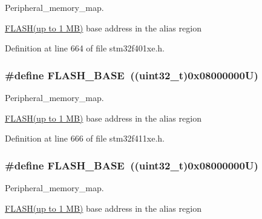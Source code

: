 Peripheral\+\_\+memory\+\_\+map. 

\hyperlink{group___peripheral__declaration_ga844ea28ba1e0a5a0e497f16b61ea306b}{F\+L\+A\+S\+H(up to 1 M\+B)} base address in the alias region 

Definition at line 664 of file stm32f401xe.\+h.

\subsubsection[{\texorpdfstring{F\+L\+A\+S\+H\+\_\+\+B\+A\+SE}{FLASH_BASE}}]{\setlength{\rightskip}{0pt plus 5cm}\#define F\+L\+A\+S\+H\+\_\+\+B\+A\+SE~((uint32\+\_\+t)0x08000000\+U)}\hypertarget{group___peripheral__registers__structures_ga23a9099a5f8fc9c6e253c0eecb2be8db}{}\label{group___peripheral__registers__structures_ga23a9099a5f8fc9c6e253c0eecb2be8db}


Peripheral\+\_\+memory\+\_\+map. 

\hyperlink{group___peripheral__declaration_ga844ea28ba1e0a5a0e497f16b61ea306b}{F\+L\+A\+S\+H(up to 1 M\+B)} base address in the alias region 

Definition at line 666 of file stm32f411xe.\+h.

\subsubsection[{\texorpdfstring{F\+L\+A\+S\+H\+\_\+\+B\+A\+SE}{FLASH_BASE}}]{\setlength{\rightskip}{0pt plus 5cm}\#define F\+L\+A\+S\+H\+\_\+\+B\+A\+SE~((uint32\+\_\+t)0x08000000\+U)}\hypertarget{group___peripheral__registers__structures_ga23a9099a5f8fc9c6e253c0eecb2be8db}{}\label{group___peripheral__registers__structures_ga23a9099a5f8fc9c6e253c0eecb2be8db}


Peripheral\+\_\+memory\+\_\+map. 

\hyperlink{group___peripheral__declaration_ga844ea28ba1e0a5a0e497f16b61ea306b}{F\+L\+A\+S\+H(up to 1 M\+B)} base address in the alias region 

